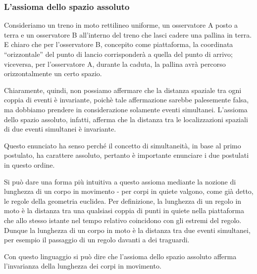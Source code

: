 \subsubsection{L'assioma dello spazio assoluto}

Consideriamo un treno in moto rettilineo uniforme, un osservatore A posto a terra e un osservatore B all’interno del
treno che lasci cadere una pallina in terra. E chiaro che per l’osservatore B, concepito come piattaforma,
 la coordinata ``orizzontale'' del punto di lancio 
corrisponderà a quella del punto di arrivo; viceversa, per l’osservatore A,
durante la caduta, la pallina avrà percorso orizzontalmente un certo spazio.

Chiaramente, quindi, non possiamo affermare che la distanza spaziale
tra ogni coppia di eventi è invariante, poichè tale affermazione sarebbe palesemente
falsa, ma dobbiamo prendere in considerazione solamente eventi simultanei.
L'assioma dello spazio assoluto, infatti, afferma che la distanza tra le localizzazioni 
spaziali di due eventi simultanei è invariante. 

Questo enunciato ha senso perché il concetto di simultaneità, in base al primo postulato, ha
carattere assoluto, pertanto è importante enunciare i due postulati in questo ordine.

Si può dare una forma più intuitiva a questo assioma mediante la nozione
di lunghezza di un corpo in movimento - per corpi in quiete valgono, come
già detto, le regole della geometria euclidea. Per definizione, la lunghezza di
un regolo in moto è la distanza tra una qualsiasi coppia di punti in quiete
nella piattaforma che allo stesso istante nel tempo relativo coincidono con
gli estremi del regolo. Dunque la lunghezza di un corpo in moto è la distanza
tra due eventi simultanei, per esempio il passaggio di un regolo davanti a dei traguardi.

Con questo linguaggio si può dire che l'assioma dello spazio assoluto
afferma l’invarianza della lunghezza dei corpi in movimento.

